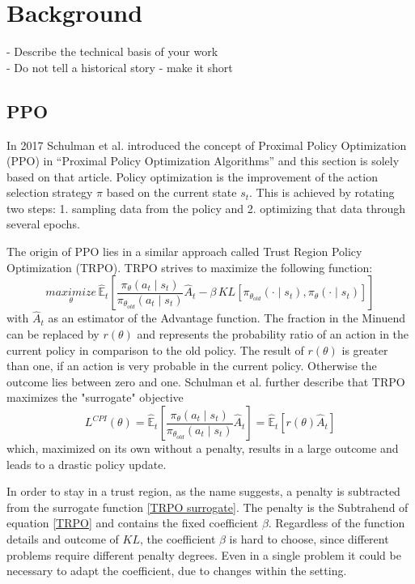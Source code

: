 \chapter{Background}\label{sec:Background}
- Describe the technical basis of your work \\
- Do not tell a historical story - make it short

\section{PPO}
In 2017 Schulman et al. introduced the concept of Proximal Policy Optimization (PPO) in
``Proximal Policy Optimization Algorithms''\cite{scwo2017} and this section is solely based on that article.
Policy optimization is the improvement of the action selection strategy $\pi$ based on the
current state $s_{t}$. This is achieved by rotating two steps: 1. sampling data from the policy and 2.
optimizing that data through several epochs.

The origin of PPO lies in a similar approach called Trust Region Policy Optimization (TRPO).
TRPO strives to maximize the following function:
\begin{equation}\label{TRPO}
    \underset{\theta}{maximize}\,\hat{\mathbb{E}}_{t} [\frac{\pi_{\theta}(a_{t} \mid s_{t})}{\pi_{\theta_{old}}(a_{t} \mid s_{t})}
    \hat{A}_{t}-\beta \, KL[\pi_{\theta_{old}}(\cdot \mid s_{t}),\pi_{\theta}(\cdot \mid s_{t})]]
\end{equation}
with $\hat{A}_{t}$ as an estimator of the Advantage function.
The fraction in the Minuend can be replaced by
$r(\theta)$ %
and represents the probability ratio of an
action in the current policy in comparison to the old policy. The result of $r(\theta)$ is greater than
one, if an action is very probable in the current policy. Otherwise the outcome lies between zero and one.
Schulman et al. further describe that TRPO maximizes the "surrogate" objective
\begin{equation}\label{TRPO surrogate}
    L^{CPI}(\theta) = \hat{\mathbb{E}}_{t}[ \frac{\pi_{\theta}(a_{t} \mid s_{t})}{\pi_{\theta_{old}}(a_{t} \mid s_{t})} \hat{A}_{t}]
    = \hat{\mathbb{E}}_{t}[r(\theta)\hat{A}_{t}]
\end{equation}
which, maximized on its own without a penalty, results in a large outcome and leads to a drastic
policy update.

In order to stay in a trust region, as the name suggests, a penalty is subtracted from the
surrogate function \eqref{TRPO surrogate}.
The penalty is the Subtrahend of equation \eqref{TRPO} and contains the fixed coefficient $\beta$.
Regardless of the function details and outcome of $KL$, the coefficient $\beta$
is hard to choose, since different problems require different penalty degrees. Even in a single problem
it could be necessary to adapt the coefficient, due to changes within the setting.

